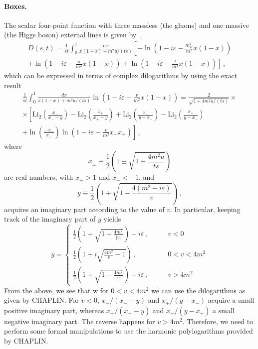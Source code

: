 \documentclass[12pt]{article}
\begin{document}
\paragraph{Boxes.} The scalar four-point function with three massless
(the gluons) and one massive (the Higgs boson) external lines is given
by~\cite{Baur:1989cm},
\begin{multline}
  \label{eq:box}
	D(s, t) = \frac{1}{st} \int_{0}^{1} \frac{\mathrm{d}x}{x(1-x)+m^2u/(ts)} \left [- \ln\left ( 1 - i \varepsilon - \frac{m_H^2}{m^2} x (1-x) \right )\right. \\ \left.
	+ \ln\left ( 1 - i \varepsilon - \frac{s}{m^2} x (1-x) \right ) + \ln\left ( 1 - i \varepsilon - \frac{t}{m^2} x (1-x) \right ) \right ] \,, 
\end{multline}
which can be expressed in terms of complex dilogarithms by using the exact result
\begin{multline}
  \label{eq:ci-dilogs}
  \frac{1}{st} \int_{0}^{1} \frac{dx}{x(1-x)+m^2u/(ts)} \ln\left ( 1 - i \varepsilon - \frac{v}{m^2} x (1-x) \right )= \frac{2}{\sqrt{1+4m^2u/(ts)}} \times  \\ \times
  \left[
    \mathrm{Li}_2\left(\frac{x_-}{x_--y}\right)-\mathrm{Li}_2\left(\frac{x_+}{x_+-y}\right)
    +\mathrm{Li}_2\left(\frac{x_-}{y-x_+}\right)-\mathrm{Li}_2\left(\frac{x_+}{y-x_-}\right)
    \right.
    \\ \left.
    + \ln\left( \frac{-x_{-}}{x_{+}} \right) \ln\left ( 1 - i \varepsilon - \frac{v}{m^2}x_-x_+ \right )
    \right]\,,
  \end{multline}
  where
  \begin{equation}
    \label{eq:xpm}
    	x_{\pm} \equiv \frac{1}{2} \left ( 1 \pm \sqrt{1 + \frac{4m^2 u}{ts}} \right )
  \end{equation}
are real numbers, with $x_+>1$ and $x_-<-1$, and
\begin{equation}
  \label{eq:y-def}
  y \equiv \frac{1}{2} \left ( 1 + \sqrt{1 - \frac{4(m^2 - i \varepsilon)}{v}} \right ) \,,
\end{equation}
acquires an imaginary part according to the value of $v$. In particular, keeping track of the imaginary part of $y$ yields
\begin{equation}
  \label{eq:y-implementation}
y = \left\{
  \begin{split}
  \frac{1}{2}\left(1+\sqrt{1+\frac{4m^2}{|v|}}\right)-i\varepsilon\,,& \qquad v<0\\
  \frac{1}{2}\left(1+i\sqrt{\frac{4m^2}{v}-1}\right)\,,& \qquad 0<v<4 m^2\\
    \frac{1}{2}\left(1+\sqrt{1-\frac{4m^2}{v}}\right)+i\varepsilon\,,& \qquad v>4m^2
  \end{split}
  \right.
\end{equation}
From the above, we see that w for $0<v<4 m^2$ we can use the
dilogarithms as given by CHAPLIN.
%
For $v<0$, $x_-/(x_--y)$ and $x_+/(y-x_-)$ acquire a small positive
imaginary part, whereas $x_+/(x_+-y)$ and $x_-/(y-x_+)$ a small
negative imaginary part. The reverse happens for $v>4m^2$. Therefore,
we need to perform some formal manipulations to use the harmonic
polylogarithms provided by CHAPLIN.
\end{document}
